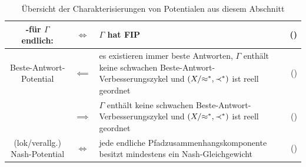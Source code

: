 \begin{table}
\begin{tabularx}{\textwidth}{ccXr}
		-für $\Gamma$ endlich:			& $\iff$	& $\Gamma$ hat FIP
		& (\Cref{kor:CharExVerOrdFIP})\\\hline
		Beste-Antwort-Potential			& $\impliedby$	& es existieren immer beste Antworten, $\Gamma$ enthält keine schwachen Beste-Antwort-Verbesserungszykel und $(X/{\approx^\ast}, \prec^\ast)$ ist reell geordnet
		& (\Cref{satz:CharExBAPot})	\\
										& $\implies$	& $\Gamma$ enthält keine schwachen Beste-Antwort-Verbesserungszykel und $(X/{\approx^\ast}, \prec^\ast)$ ist reell geordnet
		& (\Cref{satz:CharExBAPot})		\\\hline
		(lok/verallg.) Nash-Potential	& $\iff$	& jede endliche Pfadzusammenhangskomponente besitzt mindestens ein Nash-Gleichgewicht
		& (\Cref{satz:CharExNashPot})
	\end{tabularx}	
	\caption{Übersicht der Charakterisierungen von Potentialen aus diesem Abschnitt}\label{tab:PotCharakterisierung}
\end{table}
